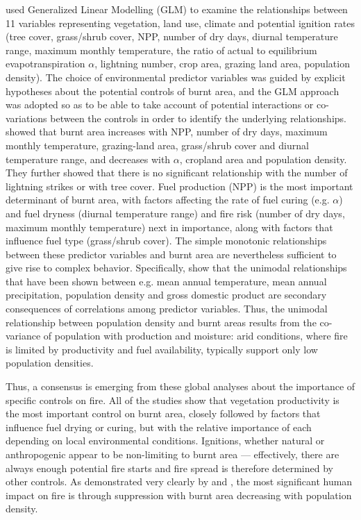 \citet{bistinas2014causal} used Generalized Linear Modelling (GLM) to examine the relationships between 11 variables representing vegetation, land use, climate and potential ignition rates (tree cover, grass/shrub cover, NPP, number of dry days, diurnal temperature range, maximum monthly temperature, the ratio of actual to equilibrium evapotranspiration $\alpha$, lightning number, crop area, grazing land area, population density).  The choice of environmental predictor variables was guided by explicit hypotheses about the potential controls of burnt area, and the GLM approach was adopted so as to be able to take account of potential interactions or co-variations between the controls in order to identify the underlying relationships.  \citet{bistinas2014causal} showed that burnt area increases with NPP, number of dry days, maximum monthly temperature, grazing-land area, grass/shrub cover and diurnal temperature range, and decreases with $\alpha$, cropland area and population density. They further showed that there is no significant relationship with the number of lightning strikes or with tree cover. Fuel production (NPP) is the most important determinant of burnt area, with factors affecting the rate of fuel curing (e.g. $\alpha$) and fuel dryness (diurnal temperature range) and fire risk (number of dry days, maximum monthly temperature) next in importance, along with factors that influence fuel type (grass/shrub cover). The simple monotonic relationships between these predictor variables and burnt area are nevertheless sufficient to give rise to complex behavior. Specifically, \citet{bistinas2014causal} show that the unimodal relationships that have been shown between e.g. mean annual temperature, mean annual precipitation, population density and gross domestic product are secondary consequences of correlations among predictor variables. Thus, the unimodal relationship between population density and burnt areas results from the co-variance of population with production and moisture: arid conditions, where fire is limited by productivity and fuel availability, typically support only low population densities.

Thus, a consensus is emerging from these global analyses about the importance of specific controls on fire. All of the studies show that vegetation productivity is the most important control on burnt area, closely followed by factors that influence fuel drying or curing, but with the relative importance of each depending on local environmental conditions. Ignitions, whether natural or anthropogenic appear to be non-limiting to burnt area --- effectively, there are always enough potential fire starts and fire spread is therefore determined by other controls. As demonstrated very clearly by \citet{Knorr2013} and \citet{Bistinas}, the most significant human impact on fire is through suppression with burnt area decreasing with population density.



